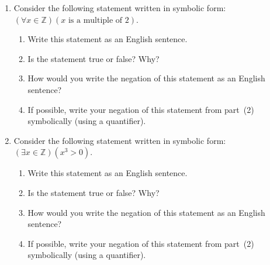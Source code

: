 \begin{previewactivity}\label{PA:negatequantifier} \hfill 
\begin{enumerate}
\item Consider the following statement written in symbolic form:\\  $\left( {\forall x \in \mathbb{Z}} \right)\left( {x\text{ is a multiple of 2}} \right)$.
  \begin{enumerate}
    \item Write this statement as an English sentence.
    \item Is the statement true or false?  Why?
    \item How would you write the negation of this statement as an English sentence?
    \item If possible, write your negation of this statement from part~(2) symbolically (using a quantifier).
  \end{enumerate}
%


\item Consider the following statement written in symbolic form:\\  $\left( {\exists x \in \mathbb{Z}} \right)\left( {x^3 > 0} \right)$.
  \begin{enumerate}
    \item Write this statement as an English sentence.
    \item Is the statement true or false?  Why?
    \item How would you write the negation of this statement as an English sentence?
    \item If possible, write your negation of this statement from part~(2) symbolically (using a quantifier).
  \end{enumerate}
\end{enumerate}
\end{previewactivity}
\hbreak


\endinput

